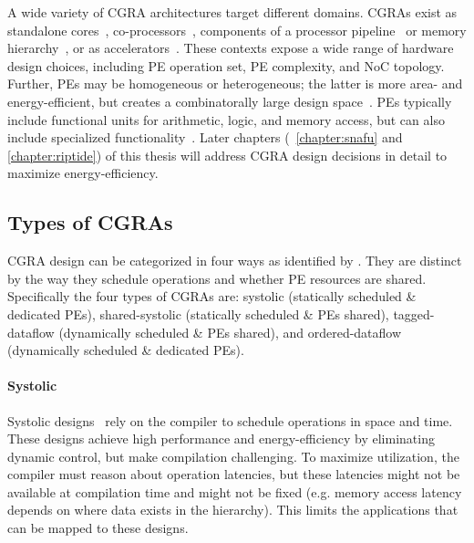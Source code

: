 A wide variety of CGRA architectures target different domains.
%
CGRAs exist as standalone cores~\cite{trips,raw,swanson2003wavescalar,mishra2006tartan},
co-processors~\cite{tan2018stitch,hauser1997garp,beret,seed,adres,charm,camel,goldstein2000piperench},
components of a processor pipeline~\cite{dyser,dynaspam,chimera}
or memory hierarchy~\cite{livia},
or as accelerators~\cite{plasticine,wave,gorgon,capstan,q100,nowatzki:isca17:stream-dataflow,weng2020hybrid,dadu2019towards,polygraph,taskstream,voitsechov2014single,nguyen2021fifer,morphosys,ppa,fpca}.
%
These contexts expose a wide range of hardware design choices, including PE
operation set, PE complexity, and NoC topology.
% 
Further, PEs may be homogeneous or heterogeneous; the latter is more area- and
energy-efficient, but creates a combinatorally large design space~\cite{revamp}.
% 
PEs typically include functional units for arithmetic, logic,
and memory access, but can also include 
specialized functionality~\cite{snafu,weng2020dsagen,dadu2019towards,q100,gorgon,capstan,polygraph,taskstream}.
% 
Later chapters (~\autoref{chapter:snafu} and \autoref{chapter:riptide}) of this thesis will address CGRA design decisions in detail to maximize energy-efficiency.

\subsection{Types of CGRAs}
CGRA design can be categorized in four ways as identified by \cite{weng2020hybrid}.
% 
They are distinct by the way they schedule operations and whether PE resources are shared.
% 
Specifically the four types of CGRAs are: systolic (statically scheduled \& dedicated PEs), shared-systolic (statically scheduled \& PEs shared),  tagged-dataflow (dynamically scheduled \& PEs shared), and ordered-dataflow (dynamically scheduled \& dedicated PEs).

\paragraph{Systolic}
Systolic designs~\cite{mishra2006tartan,goldstein2000piperench,fpca,warp,nowatzki:isca17:stream-dataflow} rely on the compiler to schedule operations in space and time.
% 
These designs achieve high performance and energy-efficiency by eliminating dynamic control, but make compilation challenging.
% 
To maximize utilization, the compiler must reason about operation latencies, but these latencies might not be available at compilation time and might not be fixed (e.g. memory access latency depends on where data exists in the hierarchy).
% 
This limits the applications that can be mapped to these designs.

